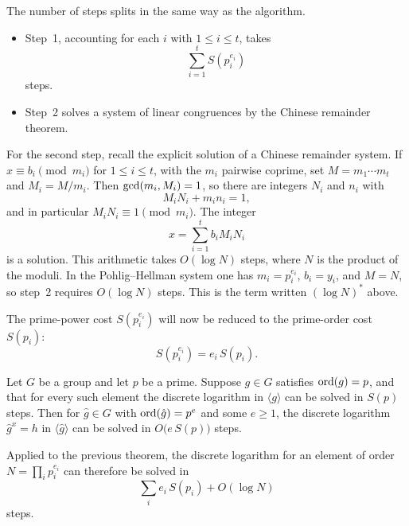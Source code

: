 The number of steps splits in the same way as the algorithm.
\begin{itemize}[leftmargin=1.4em]
    \item Step~1, accounting for each \(i\) with \(1\le i\le t\), takes
    \[
        \sum_{i=1}^{t} S(p_i^{e_i})
    \]
    steps.
    \item Step~2 solves a system of linear congruences by the Chinese
    remainder theorem.
\end{itemize}


For the second step, recall the explicit solution of a Chinese remainder
system. If \(x\equiv b_i\pmod{m_i}\) for \(1\le i\le t\), with the
\(m_i\) pairwise coprime, set \(M=m_1\cdots m_t\) and \(M_i=M/m_i\). Then
\(\operatorname{gcd}(m_i,M_i)=1\), so there are integers \(N_i\) and \(n_i\) with
\[
    M_i N_i + m_i n_i = 1,
\]
and in particular \(M_i N_i \equiv 1\pmod{m_i}\).
The integer
\[
    x = \sum_{i=1}^{t} b_i M_i N_i
\]
is a solution. This arithmetic takes \(O(\log N)\) steps, where \(N\) is
the product of the moduli. In the Pohlig--Hellman system one has
\(m_i=p_i^{e_i}\), \(b_i=y_i\), and \(M=N\), so step~2 requires
\(O(\log N)\) steps. This is the term written \((\log N)^{*}\) above.

The prime-power cost \(S(p_i^{e_i})\) will now be reduced to the
prime-order cost \(S(p_i)\):
\[
    S(p_i^{e_i}) = e_i\, S(p_i).
\]

\begin{theorem}
Let \(G\) be a group and let \(p\) be a prime. Suppose \(g\in G\)
satisfies \(\operatorname{ord}(g)=p\), and that for every such element the discrete
logarithm in \(\langle g\rangle\) can be solved in \(S(p)\) steps. Then
for \(\hat g\in G\) with \(\operatorname{ord}(\hat g)=p^e\) and some \(e\ge 1\), the
discrete logarithm \(\hat g^{x}=h\) in \(\langle\hat g\rangle\) can be
solved in \(O\bigl(e\,S(p)\bigr)\) steps.
\end{theorem}

\begingroup\samepage
Applied to the previous theorem, the discrete logarithm for an element
of order \(N=\prod_i p_i^{e_i}\) can therefore be solved in
\[
    \sum_{i} e_i\, S(p_i) + O(\log N)
\]
steps.
\endgroup

